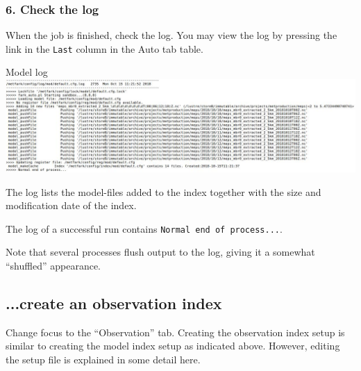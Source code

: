 \documentclass[letterpaper,10pt,twoside,twocolumn,openany]{book}
\begin{document}
{\subsubsection{6. Check the log}
When the job is finished, check the log. You may view the log by pressing the link in the \lstinline!Last! column in the Auto tab table.
\begin{paperbox}{Model log}
  \includegraphics[width=\columnwidth]{modlog.jpg}
\end{paperbox}
The log lists the model-files added to the index together with the size and modification date of the index.
\begin{quotebox}
   The log of a successful run contains \lstinline!Normal end of process...!.
\end{quotebox}
Note that several processes flush output to the log, giving it a somewhat ``shuffled'' appearance.

\subsection{...create an observation index}
Change focus to the ``Observation'' tab. 
Creating the observation index setup is similar to creating the model index setup as indicated above.
However, editing the setup file is explained in some detail here.

}
\end{document}
